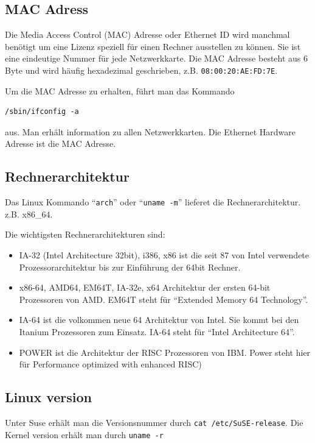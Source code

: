 \documentclass[a4paper,10pt]{report}
\newcommand{\mytt}[1]{{\tt #1}}
\begin{document}
\subsection{MAC Adress}

Die Media Access Control (MAC) Adresse oder Ethernet ID wird manchmal
ben\"otigt um eine Lizenz speziell f\"ur einen Rechner ausstellen zu
k\"onnen. Sie ist eine eindeutige Nummer f\"ur jede Netzwerkkarte.  Die
MAC Adresse besteht aus 6 Byte und wird h\"aufig hexadezimal
geschrieben, z.B. \mytt{08:00:20:AE:FD:7E}.

Um die MAC Adresse zu erhalten, f\"uhrt man das Kommando
\begin{verbatim}
/sbin/ifconfig -a
\end{verbatim}
aus. Man erh\"alt information zu allen Netzwerkkarten. Die
Ethernet Hardware Adresse  ist die MAC Adresse.

\subsection{Rechnerarchitektur}
Das Linux Kommando ``\mytt{arch}'' oder ``\mytt{uname -m}'' lieferet die
Rechnerarchitektur. z.B. x86\_64.

Die wichtigsten Rechnerarchitekturen sind:
\begin{itemize}
\item IA-32 (Intel Architecture 32bit), i386, x86 ist die seit 87 von
Intel verwendete Prozessorarchitektur bis zur Einf\"uhrung der 64bit
Rechner.
\item x86-64, AMD64, EM64T, IA-32e, x64 Architektur der ersten 64-bit
Prozessoren von AMD. EM64T steht f\"ur ``Extended Memory 64 Technology''.
\item IA-64 ist die volkommen neue 64 Architektur von Intel. Sie kommt
bei den Itanium Prozessoren zum Einsatz. IA-64 steht f\"ur ``Intel
Architecture 64''.
\item POWER ist die Architektur der RISC Prozessoren von IBM.
Power steht hier für Performance optimized with enhanced RISC)
\end{itemize}

\subsection{Linux version}

Unter Suse erh\"alt man die Versionsnummer durch
\verb+cat /etc/SuSE-release+.  Die Kernel version erh\"alt man durch
\verb+uname -r+

\end{document}
